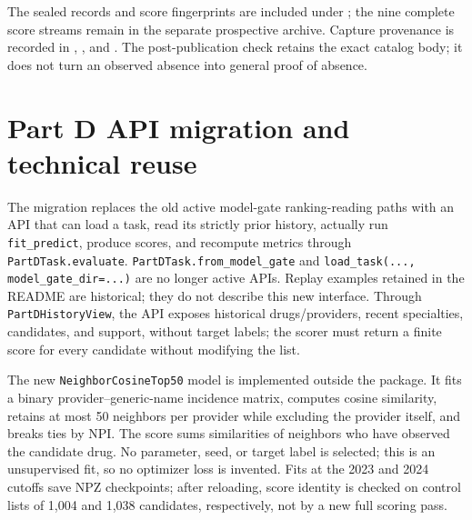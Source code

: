 The sealed records and score fingerprints are included under ; the nine complete score streams remain in the separate prospective archive. Capture provenance is recorded in , , and . The post-publication check retains the exact catalog body; it does not turn an observed absence into general proof of absence.

\par{}
\section{Part D API migration and technical reuse}
\label{supp:q2-reuse}

The migration replaces the old active model-gate ranking-reading paths with an API that can load a task, read its strictly prior history, actually run \texttt{fit\_predict}, produce scores, and recompute metrics through \texttt{PartDTask.evaluate}. \texttt{PartDTask.from\_model\_gate} and \texttt{load\_task(..., model\_gate\_dir=...)} are no longer active APIs. Replay examples retained in the README are historical; they do not describe this new interface. Through \texttt{PartDHistoryView}, the API exposes historical drugs/providers, recent specialties, candidates, and support, without target labels; the scorer must return a finite score for every candidate without modifying the list\cite{hgbq2methods}.

The new \texttt{NeighborCosineTop50} model is implemented outside the package. It fits a binary provider--generic-name incidence matrix, computes cosine similarity, retains at most 50 neighbors per provider while excluding the provider itself, and breaks ties by NPI. The score sums similarities of neighbors who have observed the candidate drug. No parameter, seed, or target label is selected; this is an unsupervised fit, so no optimizer loss is invented. Fits at the 2023 and 2024 cutoffs save NPZ checkpoints; after reloading, score identity is checked on control lists of 1,004 and 1,038 candidates, respectively, not by a new full scoring pass.

\begin{table}[!htbp]\centering\small
\caption{Raw--fit--score--evaluation reuse demonstration: the external cosine model is untuned; the SDK logistic model retains the historical 18-epoch algorithm and is not the Q2 grid's LBFGS winner.}
\label{tab:q2-reuse}

\end{table}

